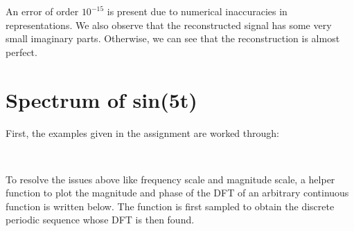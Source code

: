 \documentclass[11pt]{article}
\begin{document}
	
		
    An error of order \(10^{-15}\) is present due to numerical inaccuracies
in representations. We also observe that the reconstructed signal has
some very small imaginary parts. Otherwise, we can see that the
reconstruction is almost perfect.

	

	
		
    \section{Spectrum of sin(5t)}\label{spectrum-of-sin5t}

	

	
		
    First, the examples given in the assignment are worked through:

	

	

    \begin{center}
    \end{center}
    { \hspace*{\fill} \\}
    
	
		
    To resolve the issues above like frequency scale and magnitude scale, a
helper function to plot the magnitude and phase of the DFT of an
arbitrary continuous function is written below. The function is first
sampled to obtain the discrete periodic sequence whose DFT is then
found.

	

	
		
	
	
		
	
		
			
		
	
		
			
		
	
		
			
		
	
		
			
		
	
		
			
		
	
		
			
		
	
		
			
		
	
		
			
		
	
\end{document}
